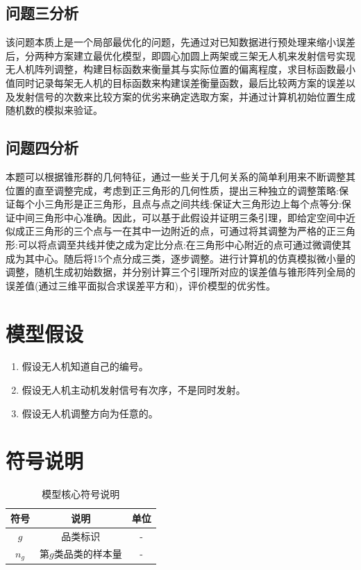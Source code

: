 \documentclass[withoutpreface,bwprint]{cumcmthesis} %
\begin{document}
\subsection{问题三分析}
该问题本质上是一个局部最优化的问题，先通过对已知数据进行预处理来缩小误差后，分两种方案建立最优化模型，即圆心加圆上两架或三架无人机来发射信号实现无人机阵列调整，构建目标函数来衡量其与实际位置的偏离程度，求目标函数最小值同时记录每架无人机的目标函数来构建误差衡量函数，最后比较两方案的误差以及发射信号的次数来比较方案的优劣来确定选取方案，并通过计算机初始位置生成随机数的模拟来验证。

\subsection{问题四分析}
本题可以根据锥形群的几何特征，通过一些关于几何关系的简单利用来不断调整其位置的直至调整完成，考虑到正三角形的几何性质，提出三种独立的调整策略:保证每个小三角形是正三角形，且点与点之间共线:保证大三角形边上每个点等分:保证中间三角形中心准确。因此，可以基于此假设并证明三条引理，即给定空间中近似成正三角形的三个点与一在其中一边附近的点，可通过将其调整为严格的正三角形:可以将点调至共线并使之成为定比分点:在三角形中心附近的点可通过微调使其成为其中心。随后将15个点分成三类，逐步调整。进行计算机的仿真模拟微小量的调整，随机生成初始数据，并分别计算三个引理所对应的误差值与锥形阵列全局的误差值(通过三维平面拟合求误差平方和)，评价模型的优劣性。
\section{模型假设}

\begin{enumerate}
    \item 假设无人机知道自己的编号。
    \item 假设无人机主动机发射信号有次序，不是同时发射。
    \item 假设无人机调整方向为任意的。
\end{enumerate}

\section{符号说明}
\begin{table}[H]
    \centering
    \caption{模型核心符号说明}
    \label{表标签}
    \begin{tabular}{ccc} 
        \toprule[1.5pt]
        \textbf{符号} & \textbf{说明} & \textbf{单位} \\
        \midrule[1pt]
        $g$ & 品类标识 & - \\
        $n_g$ & 第$g$类品类的样本量 & - \\
        \bottomrule[1.5pt]
    \end{tabular}
\end{table}
\end{document}
